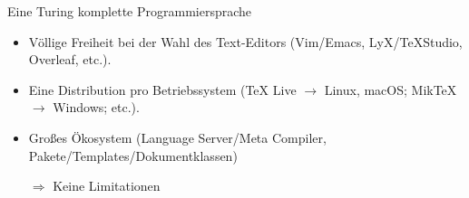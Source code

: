 

\begin{frame}{Eine Turing komplette Programmiersprache}
	\begin{itemize}[<+-|alert@+>]
		\item Völlige Freiheit bei der Wahl des Text-Editors (Vim/Emacs, LyX/TeXStudio, Overleaf, etc.).
		\item Eine Distribution pro Betriebssystem  (TeX Live $\rightarrow$ Linux, macOS; MikTeX $\rightarrow$ Windows; etc.).
		\item Großes Ökosystem (Language Server/Meta Compiler,  Pakete/Templates/Dokumentklassen)
		\item[$\Rightarrow$] Keine Limitationen
	\end{itemize}
\end{frame}

